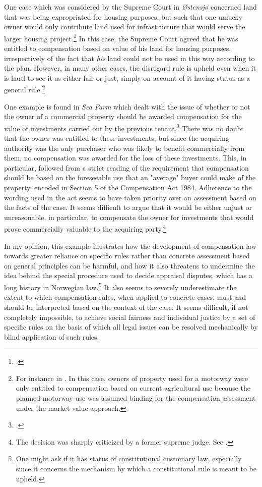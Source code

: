 One case which was considered by the Supreme Court in \emph{Østensjø} concerned land that was being expropriated for housing purposes, but such that one unlucky owner would only contribute land used for infrastructure that would serve the larger housing project.\footnote{\cite{ostensjo77}.} In this case, the Supreme Court agreed that he was entitled to compensation based on value of his land for housing purposes, irrespectively of the fact that \emph{his} land could not be used in this way according to the plan. However, in many other cases, the disregard rule is upheld even when it is hard to see it as either fair or just, simply on account of it having status as a general rule.\footnote{For instance in \cite{malvik93}. In this case, owners of property used for a motorway were only entitled to compensation based on current agricultural use because the planned motorway-use was assumed binding for the compensation assessment under the market value approach.}

One example is found in \emph{Sea Farm} which dealt with the issue of whether or not the owner of a commercial property should be awarded compensation for the value of investments carried out by the previous tenant.\footcite{seafarm08} There was no doubt that the owner was entitled to these investments, but since the acquiring authority was the only purchaser who was likely to benefit commercially from them, no compensation was awarded for the loss of these investments. This, in particular, followed from a strict reading of the requirement that compensation should be based on the foreseeable use that an "average" buyer could make of the property, encoded in Section 5 of the Compensation Act 1984. Adherence to the wording used in the act seems to have taken priority over an assessment based on the facts of the case. It seems difficult to argue that it would be either unjust or unreasonable, in particular, to compensate the owner for investments that would prove commercially valuable to the acquiring party.\footnote{The decision was sharply criticized by a former supreme judge. See \cite{skoghoy08}.}

In my opinion, this example illustrates how the development of compensation law towards greater reliance on specific rules rather than concrete assessment based on general principles can be harmful, and how it also threatens to undermine the idea behind the special procedure used to decide appraisal disputes, which has a long history in Norwegian law.\footnote{One might ask if it has status of constitutional customary law, especially since it concerns the mechanism by which a constitutional rule is meant to be upheld.} It also seems to severely underestimate the extent to which compensation rules, when applied to concrete cases, must and should be interpreted based on the context of the case. It seems difficult, if not completely impossible, to achieve social fairness and individual justice by a set of specific rules on the basis of which all legal issues can be resolved mechanically by blind application of such rules. %

